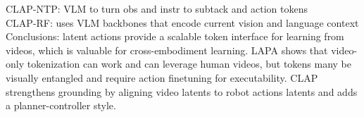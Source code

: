 CLAP-NTP: VLM to turn obs and instr to subtack and action tokens \\

CLAP-RF: uses VLM backbones that encode current vision and language context \\

Conclusions: latent actions provide a scalable token interface for learning from videos, which is valuable for cross-embodiment learning. LAPA shows that video-only tokenization can work and can leverage human videos, but tokens many be visually entangled and require action finetuning for executability. CLAP strengthens grounding by aligning video latents to robot actions latents and adds a planner-controller style.

